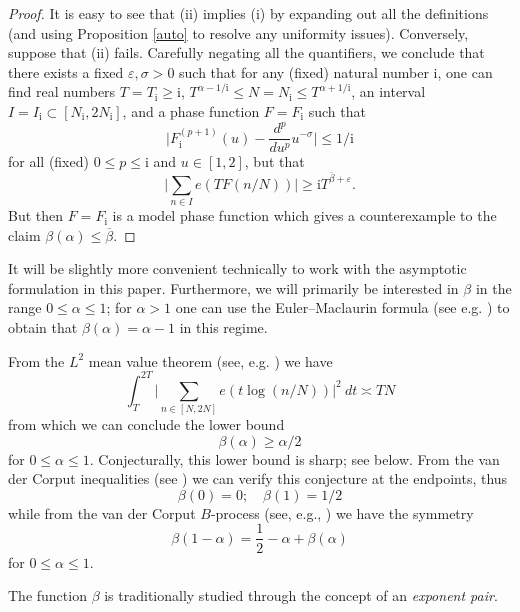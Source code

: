 \documentclass[a4paper, 10pt]{amsart}
\newcommand{\eps}{\varepsilon}
\newcommand{\ii}{{\mathrm{i}}}
\begin{document}
\begin{proof}  It is easy to see that (ii) implies (i) by expanding out all the definitions (and using Proposition \ref{auto} to resolve any uniformity issues).  Conversely, suppose that (ii) fails.  Carefully negating all the quantifiers, we conclude that there exists a fixed $\eps, \sigma > 0$ such that for any (fixed) natural number $\ii$, one can find real numbers $T = T_{\ii} \geq \ii$, $T^{\alpha-1/\ii} \leq N = N_{\ii} \leq T^{\alpha+1/\ii}$, an interval $I = I_{\ii} \subset [N_\ii, 2N_\ii]$, and a phase function $F = F_{\ii}$ such that
$$ \bigg|F_\ii^{(p+1)}(u) - \frac{d^p}{du^p} u^{-\sigma}\bigg| \leq 1/\ii$$
for all (fixed) $0 \leq p \leq \ii$ and $u \in [1,2]$, but that
$$ \bigg|\sum_{n \in I} e(T F(n/N))\bigg| \geq \ii T^{\overline{\beta}+\eps}.$$
But then $F = F_\ii$ is a model phase function which gives a counterexample to the claim $\beta(\alpha) \leq \overline{\beta}$.
\end{proof}

It will be slightly more convenient technically to work with the asymptotic formulation in this paper. Furthermore, we will primarily be interested in $\beta$ in the range $0 \leq \alpha \leq 1$; for $\alpha > 1$ one can use the Euler--Maclaurin formula (see e.g. \cite[(2.1.2)]{titchmarsh_theory_1986}) to obtain that $\beta(\alpha)=\alpha-1$ in this regime.

From the $L^2$ mean value theorem (see, e.g. \cite[Theorem 9.1]{ik}) we have
$$ \int_{T}^{2T} \bigg|\sum_{n \in [N,2N]} e(t \log(n/N)) \bigg|^2\ dt \asymp T N$$
from which we can conclude the lower bound
$$\beta(\alpha) \geq \alpha/2$$
for $0 \leq \alpha \leq 1$.  Conjecturally, this lower bound is sharp; see  below.  From the van der Corput inequalities (see \cite[Theorem 8.20]{ik}) we can verify this conjecture at the endpoints, thus
\begin{equation}\label{beta-end}
    \beta(0) = 0; \quad \beta(1) = 1/2
\end{equation}
while from the van der Corput $B$-process (see, e.g., \cite[p 370]{huxley_area_1996}) we have the symmetry
\begin{equation}\label{beta-reflect}
\beta(1-\alpha) = \frac{1}{2} - \alpha + \beta(\alpha)
\end{equation}
for $0 \leq \alpha \leq 1$.

The function $\beta$ is traditionally studied through the concept of an \emph{exponent pair}.
\end{document}
